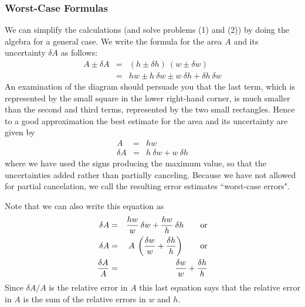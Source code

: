 \subsubsection*{Worst-Case Formulas}
We can simplify the calculations (and solve problems (1) and (2)) by doing
the algebra for a general case.
We write the formula for the area $A$ and its uncertainty $\delta A$
as follows:
\begin{eqnarray*}
A \pm \delta A& = & (h \pm \delta h) \: (w \pm \delta w) \\
  & = & h w  \pm h \: \delta w  \pm w \: \delta h + \delta h \:
        \delta w
\end{eqnarray*}
An examination of the diagram should persuade you that the last
term, which is represented by the small square in the lower right-hand
corner, is much smaller than the second and third terms, represented
by the two small rectangles.  Hence to a good approximation the
best estimate for the area and its
uncertainty are given by
\begin{eqnarray*}
A &=& hw \\
\delta A &=& h \: \delta w + w \: \delta h
\end{eqnarray*}
where we have used the signs producing the maximum
value, so
that the uncertainties added rather than partially canceling.  Because
we have not allowed for partial cancelation, we call the resulting
error estimates ``worst-case errors".

 Note that we can also write this equation as
\begin{eqnarray*}
\delta A & = & {{h w} \over {w}} \: \delta w + {{h w} \over {h}} \:
               \delta h \qquad \mbox{or} \\
\delta A & = & A \: \left({{\delta w} \over {w}} + {{\delta h} \over {h}}
               \right) \qquad \mbox{or} \\
{\delta A \over A}& = & {{\delta w} \over {w}} + {{\delta h} \over {h}}
\end{eqnarray*}
Since $\delta A/A$ is the relative error in $A$ this last equation says
that the relative error in $A$ is the sum of the relative errors in $w$ and $h$.

